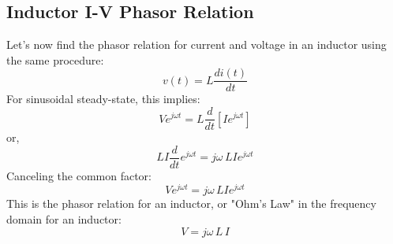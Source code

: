 \subsection{Inductor I-V Phasor Relation}
Let's now find the phasor relation for current and voltage in an inductor using the same procedure:
    \begin{equation}
        v(t) = L\frac{{di(t)}}{{dt}}
    \end{equation} 
For sinusoidal steady-state, this implies:
    \begin{equation}
        V{e^{j\omega t}} = L\frac{d}{{dt}}[I{e^{j\omega t}}]
    \end{equation}
or,
    \begin{equation}
        LI\frac{d}{{dt}}{e^{j\omega t}} = j\omega \,LI{e^{j\omega t}}
    \end{equation}
Canceling the common factor:
    \begin{equation}
        V{e^{j\omega t}} = j\omega \,LI{e^{j\omega t}}
    \end{equation}
This is the phasor relation for an inductor, or "Ohm's Law" in the frequency domain for an inductor:
    \begin{equation}
        V = j\omega \,L\,I
    \end{equation}
